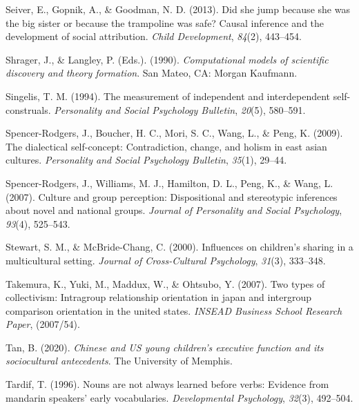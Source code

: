 \documentclass[10pt, letterpaper]{article}
\newenvironment{CSLReferences}%
  {}%
  {\par}
\begin{document}
\begin{CSLReferences}{1}{0}
\leavevmode{}%
Seiver, E., Gopnik, A., \& Goodman, N. D. (2013). Did she jump because
she was the big sister or because the trampoline was safe? Causal
inference and the development of social attribution. \emph{Child
Development}, \emph{84}(2), 443--454.

\leavevmode{}%
Shrager, J., \& Langley, P. (Eds.). (1990). \emph{Computational models
of scientific discovery and theory formation}. San Mateo, CA: Morgan
Kaufmann.

\leavevmode{}%
Singelis, T. M. (1994). The measurement of independent and
interdependent self-construals. \emph{Personality and Social Psychology
Bulletin}, \emph{20}(5), 580--591.

\leavevmode{}%
Spencer-Rodgers, J., Boucher, H. C., Mori, S. C., Wang, L., \& Peng, K.
(2009). The dialectical self-concept: Contradiction, change, and holism
in east asian cultures. \emph{Personality and Social Psychology
Bulletin}, \emph{35}(1), 29--44.

\leavevmode{}%
Spencer-Rodgers, J., Williams, M. J., Hamilton, D. L., Peng, K., \&
Wang, L. (2007). Culture and group perception: Dispositional and
stereotypic inferences about novel and national groups. \emph{Journal of
Personality and Social Psychology}, \emph{93}(4), 525--543.

\leavevmode{}%
Stewart, S. M., \& McBride-Chang, C. (2000). Influences on children's
sharing in a multicultural setting. \emph{Journal of Cross-Cultural
Psychology}, \emph{31}(3), 333--348.

\leavevmode{}%
Takemura, K., Yuki, M., Maddux, W., \& Ohtsubo, Y. (2007). Two types of
collectivism: Intragroup relationship orientation in japan and
intergroup comparison orientation in the united states. \emph{INSEAD
Business School Research Paper}, (2007/54).

\leavevmode{}%
Tan, B. (2020). \emph{Chinese and US young children's executive function
and its sociocultural antecedents}. The University of Memphis.

\leavevmode{}%
Tardif, T. (1996). Nouns are not always learned before verbs: Evidence
from mandarin speakers' early vocabularies. \emph{Developmental
Psychology}, \emph{32}(3), 492--504.


\end{CSLReferences}
\end{document}

